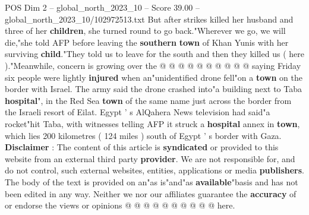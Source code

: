\begin{textsample}{POS Dim 2 – global\_north\_2023\_10 – Score 39.00 – global\_north\_2023\_10/102972513.txt}
But after strikes killed her husband and three of her \textbf{children}, she turned round to go back."Wherever we go, we will die,"she told AFP before leaving the \textbf{southern} \textbf{town} of Khan Yunis with her surviving \textbf{child}."They told us to leave for the south and then they killed us ( here )."Meanwhile, concern is growing over the @ @ @ @ @ @ @ @ @ @ saying Friday six people were lightly \textbf{injured} when an"unidentified drone fell"on a \textbf{town} on the border with Israel.
The army said the drone crashed into"a building next to Taba \textbf{hospital}", in the Red Sea \textbf{town} of the same name just across the border from the Israeli resort of Eilat.
Egypt ' s AlQahera News television had said"a rocket"hit Taba, with witnesses telling AFP it struck a \textbf{hospital} annex in \textbf{town}, which lies 200 kilometres ( 124 miles ) south of Egypt ' s border with Gaza. \textbf{Disclaimer} : The content of this article is \textbf{syndicated} or provided to this website from an external third party \textbf{provider}.
We are not responsible for, and do not control, such external websites, entities, applications or media \textbf{publishers}.
The body of the text is provided on an"as is"and"as \textbf{available}"basis and has not been edited in any way.
Neither we nor our affiliates guarantee the \textbf{accuracy} of or endorse the views or opinions @ @ @ @ @ @ @ @ @ @ here.

\end{textsample}
